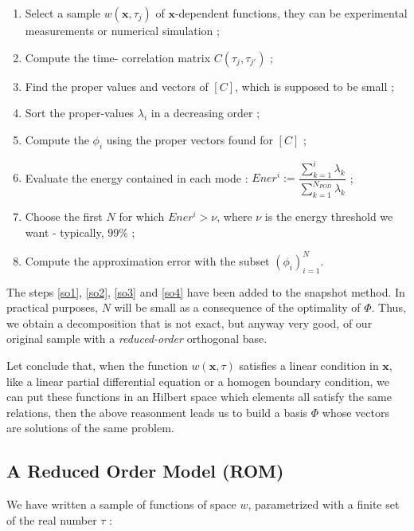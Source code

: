 \begin{algo}\label{a_snap}
\begin{enumerate}
\item Select a sample $w(\mathbf{x},\tau_j)$ of $\mathbf{x}$-dependent functions, %
they can be experimental measurements or numerical simulation ;
\item Compute the \og{}time-\fg{} correlation matrix $C(\tau_j ,\tau_{j'})$ ;
\item Find the proper values and vectors of $[C]$, which is supposed to be small ;
\item\label{so1} Sort the proper-values $\lambda_i$ in a decreasing order ;
\item Compute the $\phi_i$ using the proper vectors found for $[C]$ ;
\item\label{so2} Evaluate the energy contained in each mode : $Ener^i:=\dfrac{\sum\limits_{k=1}^i\lambda_k}{\sum\limits_{k=1}^{N_{POD}}\lambda_k}$ ;
\item\label{so3} Choose the first $N$ for which $Ener^i >\nu$, where $\nu$ is the energy threshold we want - typically, $99\%$ ;
\item\label{so4} Compute the approximation error with the subset $(\phi_i)_{i=1}^{N}$.
\end{enumerate}
\end{algo}

The steps \ref{so1}, \ref{so2}, \ref{so3} and \ref{so4} have been added to the snapshot method. %
In practical purposes, $N$ will be small as a consequence of the optimality of $\Phi$. %
Thus, we obtain a decomposition that is not exact, but anyway very good, of our original sample with a \emph{reduced-order} orthogonal base.

\ligneinter
Let conclude that, when the function $w(\mathbf{x},\tau)$ satisfies a linear condition in $\mathbf{x}$, %
like a linear partial differential equation or a homogen boundary condition, %
we can put these functions in an Hilbert space which elements all satisfy the same relations, %
then the above reasonment leads us to build a basis $\Phi$ whose vectors are solutions of the same problem.

\subsection{A Reduced Order Model (ROM)}

We have written a sample of functions of space $w$, parametrized with a finite set of the real number $\tau$ :

